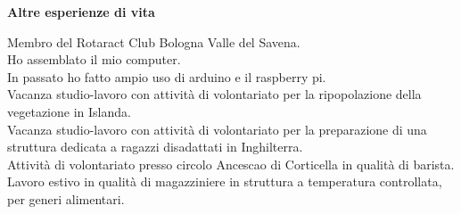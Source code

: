 \documentclass[a4paper,12pt,final]{memoir}
\newcommand{\Sep}{\vspace{1.5em}}
\newcommand{\SmallSep}{\vspace{0.5em}}
\newcommand{\CVSection}[1]
	{\Large\textbf{#1}\par
	\SmallSep\normalsize\normalfont}
\begin{document}
\CVSection{Altre esperienze di vita}
	Membro del Rotaract Club Bologna Valle del Savena.
	\\Ho assemblato il mio computer.
	\\In passato ho fatto ampio uso di arduino e il raspberry pi.
	\\Vacanza studio-lavoro con attività di volontariato per la ripopolazione della vegetazione in Islanda.
	\\Vacanza studio-lavoro con attività di volontariato per la preparazione di una struttura dedicata a ragazzi disadattati in Inghilterra.
	\\Attività di volontariato presso circolo Ancescao di Corticella in qualità di barista.
	\\Lavoro estivo in qualità di magazziniere in struttura a temperatura controllata, per generi alimentari.
\Sep


\end{document}
